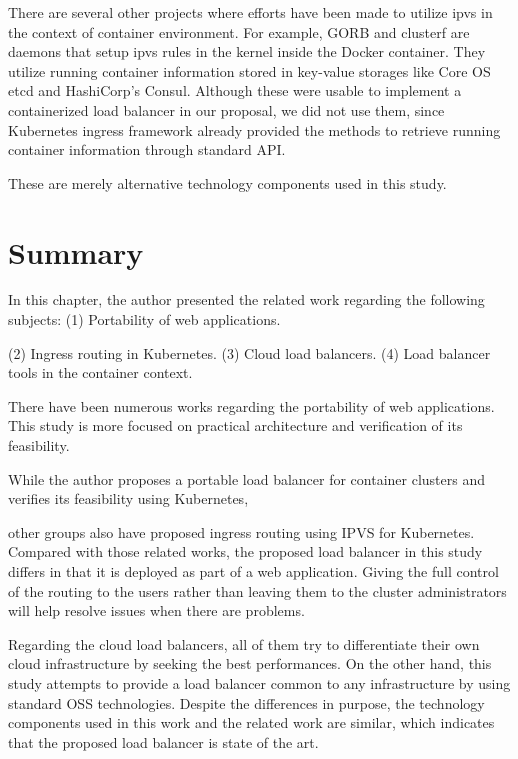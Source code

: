 There are several other projects where efforts have been made to utilize ipvs in the context of container environment.
For example, GORB\cite{Sibiryov2015} and clusterf\cite{Aaltodoc:http://urn.fi/URN:NBN:fi:aalto-201611025433} are daemons 
that setup ipvs rules in the kernel inside the Docker container. 
They utilize running container information stored in key-value storages
like Core OS etcd\cite{CoreOSEtcd} and HashiCorp's Consul\cite{HashiCorpConsul}. 
Although these were usable to implement a containerized load balancer in our proposal, we did not use them, 
since Kubernetes ingress framework already provided the methods to retrieve running container information through standard API.

These are merely alternative technology components used in this study.


\section{Summary}

In this chapter, the author presented the related work regarding the following subjects:
(1) Portability of web applications.


(2) Ingress routing in Kubernetes.
(3) Cloud load balancers.
(4) Load balancer tools in the container context.


There have been numerous works regarding the portability of web applications.
This study is more focused on practical architecture and verification of its feasibility.



While the author proposes a portable load balancer for container clusters and verifies its feasibility using Kubernetes, 

other groups also have proposed ingress routing using IPVS for Kubernetes.
Compared with those related works, the proposed load balancer in this study differs in that it is deployed as part of a web application.
Giving the full control of the routing to the users rather than leaving them to the cluster administrators will help resolve issues when there are problems.

Regarding the cloud load balancers, all of them try to differentiate their own cloud infrastructure by seeking the best performances.
On the other hand, this study attempts to provide a load balancer common to any infrastructure by using standard OSS technologies.
Despite the differences in purpose, the technology components used in this work and the related work are similar, which indicates that the proposed load balancer is state of the art.
